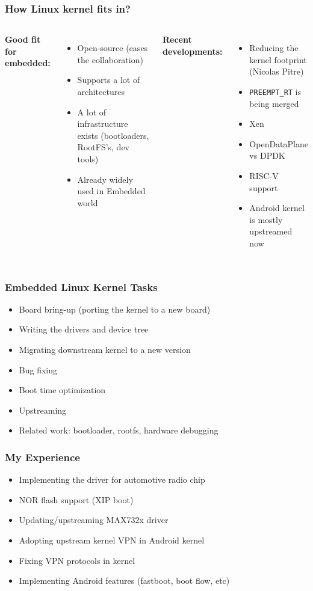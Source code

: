 \documentclass[aspectratio=169]{beamer}
\begin{document}
\begin{frame}
  \frametitle{How Linux kernel fits in?}
  \begin{columns}
    \textbf{Good fit for embedded:}
  \begin{itemize}
    \item Open-source (eases the collaboration)
    \item Supports a lot of architectures
    \item A lot of infrastructure exists (bootloaders, RootFS's, dev tools)
    \item Already widely used in Embedded world
  \end{itemize}

  \pause
  \textbf{Recent developments:}
  \begin{itemize}
    \item Reducing the kernel footprint (Nicolas Pitre)
    \item \texttt{PREEMPT\_RT} is being merged
    \item Xen
    \item OpenDataPlane vs DPDK
    \item RISC-V support
    \item Android kernel is mostly upstreamed now
  \end{itemize}
  \end{columns}
\end{frame}

\begin{frame}
  \frametitle{Embedded Linux Kernel Tasks}
  \begin{itemize}
    \item Board bring-up (porting the kernel to a new board)
    \item Writing the drivers and device tree
    \item Migrating downstream kernel to a new version
    \item Bug fixing
    \item Boot time optimization
    \item Upstreaming
    \item Related work: bootloader, rootfs, hardware debugging
  \end{itemize}
\end{frame}

\begin{frame}
  \frametitle{My Experience}
  \begin{itemize}
    \item Implementing the driver for automotive radio chip
    \item NOR flash support (XIP boot)
    \item Updating/upstreaming MAX732x driver
    \item Adopting upstream kernel VPN in Android kernel
    \item Fixing VPN protocols in kernel
    \item Implementing Android features (fastboot, boot flow, etc)
  \end{itemize}
\end{frame}
\end{document}
